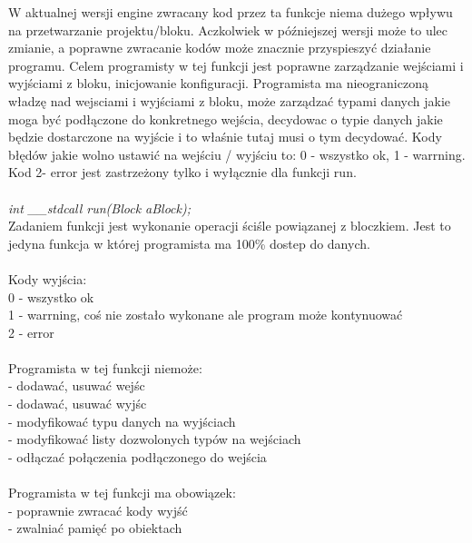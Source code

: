 W aktualnej wersji engine zwracany kod przez ta funkcje niema dużego wpływu na przetwarzanie projektu/bloku. Aczkolwiek w późniejszej wersji może to ulec zmianie, a poprawne zwracanie kodów może znacznie przyspieszyć działanie programu. Celem programisty w tej funkcji jest poprawne zarządzanie wejściami i wyjściami z bloku, inicjowanie konfiguracji. Programista ma nieograniczoną władzę nad wejsciami i wyjściami z bloku, może zarządzać typami danych jakie moga być podłączone do konkretnego wejścia, decydowac o typie danych jakie będzie dostarczone na wyjście i to właśnie tutaj musi o tym decydować. Kody błędów jakie wolno ustawić na wejściu / wyjściu to: 0 - wszystko ok, 1 - warrning. Kod 2- error jest zastrzeżony tylko i wyłącznie dla funkcji run.\\\\
\textit{int \_\_stdcall run(Block \*aBlock);}\\
Zadaniem funkcji jest wykonanie operacji ściśle powiązanej z bloczkiem. Jest to jedyna funkcja w której programista ma 100\% dostep do danych.\\\\
Kody wyjścia:\\
0 - wszystko ok\\
1 - warrning, coś nie zostało wykonane ale program może kontynuować\\
2 - error\\
\\
Programista w tej funkcji niemoże:\\
- dodawać, usuwać wejśc\\
- dodawać, usuwać wyjśc\\
- modyfikować typu danych na wyjściach\\
- modyfikować listy dozwolonych typów na wejściach\\
- odłączać połączenia podłączonego do wejścia\\
\\
Programista w tej funkcji ma obowiązek:\\
- poprawnie zwracać kody wyjść\\
- zwalniać pamięć po obiektach\\
